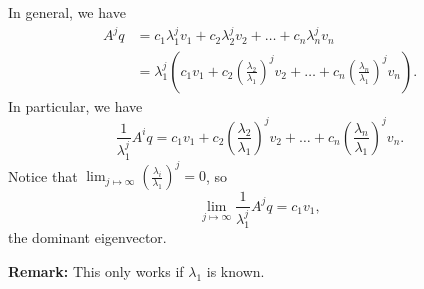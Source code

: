 \documentclass[letterpaper]{article}
\newcommand{\0}{\mathbf{0}}
\begin{document}
In general, we have 
\begin{equation*}
    \begin{aligned}
        A^j q &= c_1 \lambda_1^j v_1 + c_2 \lambda_2^j v_2 + \hdots + c_n \lambda_n^j v_n \\ 
            &= \lambda_1^j \left(c_1 v_1 + c_2 \left(\frac{\lambda_2}{\lambda_1}\right)^j v_2 + \hdots + c_n \left(\frac{\lambda_n}{\lambda_1}\right)^j v_n\right).
    \end{aligned}
\end{equation*}
In particular, we have 
\[\frac{1}{\lambda_1^j} A^i q = c_1 v_1 + c_2 \left(\frac{\lambda_2}{\lambda_1}\right)^j v_2 + \hdots + c_n \left(\frac{\lambda_n}{\lambda_1}\right)^j v_n.\]
Notice that $\lim_{j \mapsto \infty} \left(\frac{\lambda_i}{\lambda_1}\right)^j = 0$, so \[\lim_{j \mapsto \infty} \frac{1}{\lambda_1^j} A^j q = c_1 v_1,\]
the dominant eigenvector.

\bigskip 

\textbf{Remark:} This only works if $\lambda_1$ is known. 
\end{document}
